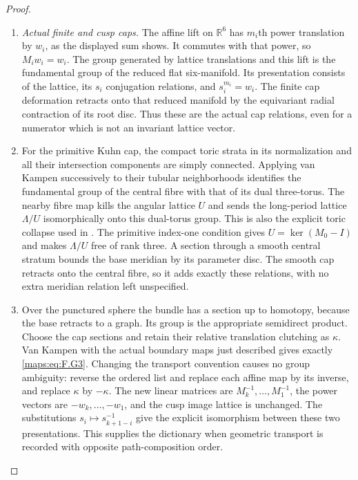 \begin{proof}
\begin{enumerate}[label=\arabic*.]
\item \emph{Actual finite and cusp caps.}
The affine lift on $\mathbb R^6$ has $m_i$th power translation by
$w_i$, as the displayed sum shows.  It commutes with that power,
so $M_iw_i=w_i$.  The group generated by lattice translations
and this lift is the fundamental group of the reduced flat
six-manifold.  Its presentation consists of the lattice, its
$s_i$ conjugation relations, and $s_i^{m_i}=w_i$.
The finite cap deformation retracts onto that reduced manifold
by the equivariant radial contraction of its root disc.
Thus these are the actual cap relations, even for a numerator
which is not an invariant lattice vector.

\item For the primitive Kuhn cap, the compact toric strata in its
normalization and all their intersection components are simply
connected.  Applying van Kampen successively to their tubular
neighborhoods identifies the fundamental group of the central
fibre with that of its dual three-torus.  The nearby fibre map
kills the angular lattice $U$ and sends the long-period lattice
$\Lambda/U$ isomorphically onto this dual-torus group.  This is
also the explicit toric collapse used in .  The primitive
index-one condition gives $U=\ker(M_0-I)$ and makes $\Lambda/U$
free of rank three.  A section through a smooth central stratum
bounds the base meridian by its parameter disc.  The smooth cap
retracts onto the central fibre, so it adds exactly these
relations, with no extra meridian relation left unspecified.

\item Over the punctured sphere the bundle has a section up to homotopy,
because the base retracts to a graph.  Its group is the appropriate
semidirect product.  Choose the cap sections and retain their
relative translation clutching as $\kappa$.  Van Kampen with the
actual boundary maps just described gives exactly \eqref{maps:eq:F.G3}.
Changing the transport convention causes no group ambiguity:
reverse the ordered list and replace each affine map by its
inverse, and replace $\kappa$ by $-\kappa$.  The new linear
matrices are $M_k^{-1},\ldots,M_1^{-1}$, the power vectors are
$-w_k,\ldots,-w_1$, and the cusp image lattice is unchanged.
The substitutions $s_i\mapsto s_{k+1-i}^{-1}$ give the explicit
isomorphism between these two presentations.  This supplies the
dictionary when geometric transport is recorded with opposite
path-composition order.


\end{enumerate}
\end{proof}
